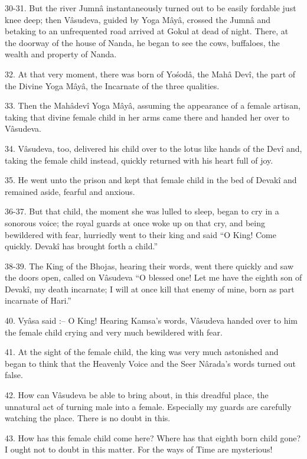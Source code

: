 30-31. But the river Jumn\^a instantaneously turned out to be easily fordable just knee deep; then V\^asudeva, guided by Yoga M\^ay\^a, crossed the Jumn\^a and betaking to an unfrequented road arrived at Gokul at dead of night. There, at the doorway of the house of Nanda, he began to see the cows, buffaloes, the wealth and property of Nanda.

32. At that very moment, there was born of Yo\'sod\^a, the Mah\^a Dev\^i, the part of the Divine Yoga M\^ay\^a, the Incarnate of the three qualities.

33. Then the Mah\^adev\^i Yoga M\^ay\^a, assuming the appearance of a female artisan, taking that divine female child in her arms came there and handed her over to V\^asudeva.

34. V\^asudeva, too, delivered his child over to the lotus like hands of the Dev\^i and, taking the female child instead, quickly returned with his heart full of joy.

35. He went unto the prison and kept that female child in the bed of Devak\^i and remained aside, fearful and anxious.

36-37. But that child, the moment she was lulled to sleep, began to cry in a sonorous voice; the royal guards at once woke up on that cry, and being bewildered with fear, hurriedly went to their king and said ``O King! Come quickly. Devak\^i has brought forth a child.''

38-39. The King of the Bhojas, hearing their words, went there quickly and saw the doors open, called on V\^asudeva ``O blessed one! Let me have the eighth son of Devak\^i, my death incarnate; I will at once kill that enemy of mine, born as part incarnate of Hari.''

40. Vy\^asa said :-- O King! Hearing Kamsa's words, V\^asudeva handed over to him the female child crying and very much bewildered with fear.

41. At the sight of the female child, the king was very much astonished and began to think that the Heavenly Voice and the Seer N\^arada's words turned out false.

42. How can V\^asudeva be able to bring about, in this dreadful place, the unnatural act of turning male into a female. Especially my guards are carefully watching the place. There is no doubt in this.

43. How has this female child come here? Where has that eighth born child gone? I ought not to doubt in this matter. For the ways of Time are mysterious!

